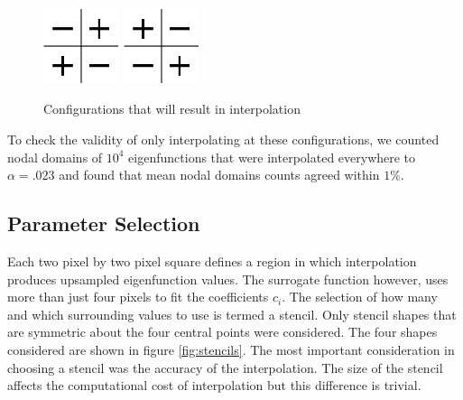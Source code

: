 \documentclass{report}
\begin{document}
\begin{figure}
  \begin{center}
    \includegraphics[width=0.2\textwidth]{figs/interpolation/trouble_spot1.eps}
    \hspace{1 cm} 
    \includegraphics[width=0.2\textwidth]{figs/interpolation/trouble_spot2.eps}
    \caption{Configurations that will result in interpolation}
    \label{fig:trouble_spot}
  \end{center}
\end{figure}

To check the validity of only interpolating at these configurations, we counted nodal domains of $10^{4}$ eigenfunctions that were interpolated everywhere to $\alpha = .023$ and found that mean nodal domains counts agreed within $1\%$. %

\subsection{Parameter Selection}
\label{sec:params}
Each two pixel by two pixel square defines a region in which interpolation produces upsampled eigenfunction values. The surrogate function however, uses more than just four pixels to fit the coefficients $c_i$. The selection of how many and which surrounding values to use is termed a stencil. Only stencil shapes that are symmetric about the four central points were considered. The four shapes considered are shown in figure \ref{fig:stencils}. The most important consideration in choosing a stencil was the accuracy of the interpolation. The size of the stencil affects the computational cost of interpolation but this difference is trivial.
\end{document}
